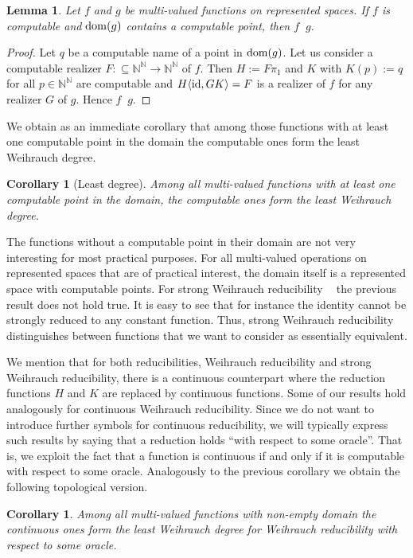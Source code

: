 \documentclass[jsl,10pt]{noasl}
\def\IN{{\mathbb{N}}}
\def\In{\subseteq}
\def\id{{\rm id}}
\def\dom{{\rm dom}}
\def\leqW{\mathop{\leq_{\mathrm{W}}}}
\def\leqSW{\mathop{\leq_{\mathrm{sW}}}}
\newtheorem{lemma}[proposition]{Lemma}
\newtheorem{corollary}[proposition]{Corollary}
\begin{document}
\begin{lemma}
\label{least:least}
Let $f$ and $g$ be multi-valued functions 
on represented spaces. If $f$ is computable and $\dom(g)$ contains
a computable point, then $f\leqW g$.
\end{lemma}
\begin{proof}
Let $q$ be a computable name of a point in $\dom(g)$. Let us consider a computable realizer
$F:\In\IN^\IN\to\IN^\IN$ of $f$. Then $H:=F\pi_1$ and $K$ with $K(p):=q$ for all $p\in\IN^\IN$
are computable and $H\langle\id,GK\rangle=F$ is a realizer of $f$ for any realizer
$G$ of $g$. Hence $f\leqW g$.
\end{proof}

We obtain as an immediate corollary that among those functions 
with at least one computable point in the domain the computable ones
form the least Weihrauch degree.

\begin{corollary}[Least degree]
\label{cor:least}
Among all multi-valued functions with at least 
one computable point in the domain, the computable ones form the least
Weihrauch degree.
\end{corollary}

The functions without a computable point in their domain are not very
interesting for most practical purposes. For all multi-valued operations
on represented spaces that are of practical interest, the domain itself
is a represented space with computable points.
For strong Weihrauch reducibility $\leqSW$ the previous result does not
hold true. It is easy to see that for instance the identity cannot 
be strongly reduced to any constant function.
Thus, strong Weihrauch reducibility distinguishes between functions
that we want to consider as essentially equivalent.

We mention that for both reducibilities, Weihrauch reducibility and strong
Weihrauch reducibility, there is a continuous counterpart where the 
reduction functions $H$ and $K$ are replaced by continuous functions.
Some of our results hold analogously for continuous Weihrauch reducibility.
Since we do not want to introduce further symbols for continuous reducibility,
we will typically express such results by saying that a reduction holds
``with respect to some oracle''. That is, we exploit the fact that a function
is continuous if and only if it is computable with respect to some oracle.
Analogously to the previous corollary we obtain the following topological
version.

\begin{corollary}
Among all multi-valued functions with non-empty domain the continuous 
ones form the least Weihrauch degree for Weihrauch reducibility with 
respect to some oracle. 
\end{corollary}
\end{document}
